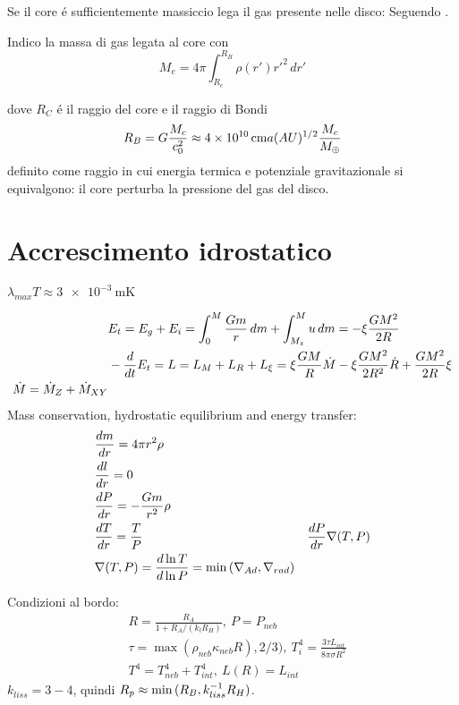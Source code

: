 Se il core \'e sufficientemente massiccio lega il gas presente nelle disco: 
Seguendo \cite{rafikov2006atmospheres}.

Indico la massa di gas legata al core con
\begin{equation}
M_e=4\pi\int_{R_c}^{R_B}\rho(r')r'^2\,dr'
\end{equation}

dove $R_C$ \'e il raggio del core e il raggio di Bondi
\begin{equation}
R_B=G\frac{M_c}{c_0^2}\approx\SI{4e10}{\cm}a(AU)\expy{1/2}\frac{M_c}{\mearth{}}
\end{equation}
definito come raggio in cui energia termica e potenziale gravitazionale si equivalgono: il core perturba la pressione del gas del disco.



\section{Accrescimento idrostatico}



\begin{workout}
$\lambda_{max}T\approx \SI{3e-3}{\meter\kelvin}$
\end{workout}



\begin{workout}
\begin{align}
&E_t=E_g+E_i=\int_0^M\frac{Gm}{r}\,dm+\int_{M_z}^Mu\,dm=-\xi\frac{GM^2}{2R}\\
&-\TDof{t}E_t=L=L_M+L_R+L_{\xi}=\xi\frac{GM}{R}\dot{M}-\xi\frac{GM^2}{2R^2}\dot{R}+\frac{GM^2}{2R}\xi\\
\dot{M}=\dot{M}_Z+\dot{M}_{XY}
\end{align}
Mass conservation, hydrostatic equilibrium and energy transfer:
\begin{align}
&\TDy{r}{m}=4\pi r^2\rho\\
&\TDy{r}{l}=0\\
&\TDy{r}{P}=-\frac{Gm}{r^2}\rho\\
&\TDy{r}{T}=\frac{T}{P}&\TDy{r}{P}\nabla(T,P)\\
&\nabla(T,P)=\TDly{P}{T}=\min{(\nad{},\nrad{})}
\end{align}

Condizioni al bordo:
\begin{align}
&R=\frac{R_A}{1+R_A/(k_lR_H )},\ P=P_{neb}\\
&\tau=\max{(\rho_{neb}\kappa_{neb}R),2/3)},\ T_i^4=\frac{3\tau L_{int}}{8\pi\sigma R^2}\\
&T^4=T_{neb}^4+T_{int}^4,\ L(R)=L_{int}
\end{align}
$k_{liss}=3-4$, quindi $R_p\approx \min{(R_B,k_{liss}\expy{-1}R_H)}$.
\end{workout}

